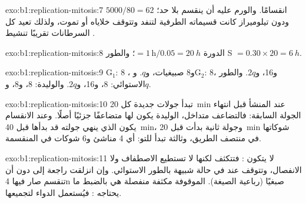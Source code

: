 \begin{solution}{exo:b1:replication-mitosis:7}
$5000/80 = 62$ انقسامًا. والورم عليه أن ينقسم بلا حد؛ ودون تيلوميراز
كانت قسيماته الطرفية لتنفد وتتوقف خلاياه أو تموت، ولذلك تعيد كل
السرطانات تقريبًا تنشيط .
\end{solution}

\begin{solution}{exo:b1:replication-mitosis:8}
الدورة $= 1\,\mathrm{h}/0.05 = \qty{20}{h}$؛ والطور S
$= 0.30\times 20 =
\qty{6}{h}$.
\end{solution}

\begin{solution}{exo:b1:replication-mitosis:9}
G$_1$: 8 ، و8 صبيغيات، و$q$. وG$_2$: 8، و16، و$2q$. والطور
الاستوائي: 8، و16، و$2q$. والوليدة: 8، و8، و$q$.
\end{solution}

\begin{solution}{exo:b1:replication-mitosis:10}
تبدأ جولات جديدة كل \qty{20}{min} عند المنشأ قبل انتهاء الجولة
السابقة: فالتضاعف متداخل،  الوليدة يكون  لها متضاعفًا
جزئيًا أصلًا. وعند الانقسام يكون  الذي ينهي جولته قد بدأها قبل
\qty{40}{min}، وجولة ثانية بدأت قبل \qty{20}{min} شوكاتها في منتصف
الطريق، وثالثة تبدأ للتو: أي 4 مناشئ و6 شوكات في  المنقسمة.
\end{solution}

\begin{solution}{exo:b1:replication-mitosis:11}
لا يتكون : فتتكثف  لكنها لا تستطيع الاصطفاف ولا الانفصال،
وتتوقف  عند   في حالة شبيهة بالطور الاستوائي.
وإن انزلقت راجعة إلى  دون أن تنقسم صار فيها 4n صبغيًا
(رباعية الصيغة).  الموقوفة  مكثفة منفصلة هي بالضبط ما
يحتاجه : فيُستعمل الدواء لتجميعها.
\end{solution}

